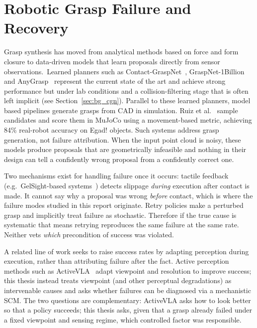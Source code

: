 \documentclass[11pt,a4paper]{report}
\begin{document}
\section{Robotic Grasp Failure and Recovery}
\label{sec:bg_grasp}

Grasp synthesis has moved from analytical methods based on force and form closure to data-driven models that learn proposals directly from sensor observations.~Learned planners such as Contact-GraspNet~\cite{sundermeyer2021contactgraspnet}, GraspNet-1Billion~\cite{fang2020graspnet} and AnyGrasp~\cite{fang2023anygrasp} represent the current state of the art and achieve strong performance but under lab conditions and a collision-filtering stage that is often left implicit (see Section~\ref{sec:bg_cgn}). Parallel to these learned planners, model based pipelines generate grasps from CAD in simulation. Ruiz et al.~\cite{ruiz2025physics} sample candidates and score them in MuJoCo using a movement-based metric, achieving 84\% real-robot accuracy on Egad! objects. Such systems address grasp generation, not failure attribution. When the input point cloud is noisy, these models produce proposals that are geometrically infeasible and nothing in their design can tell a confidently wrong proposal from a confidently correct one.

Two mechanisms exist for handling failure once it occurs: tactile feedback (e.g.\ GelSight-based systems~\cite{calandra2018more}) detects slippage \emph{during} execution after contact is made. It cannot say why a proposal was wrong \emph{before} contact, which is where the failure modes studied in this report originate. Retry policies make a perturbed grasp and implicitly treat failure as stochastic. Therefore if the true cause is systematic that means retrying reproduces the same failure at the same rate. Neither vets \emph{which} precondition of success was violated. 

A related line of work seeks to raise success rates by adapting perception during execution, rather than attributing failure after the fact. Active perception methods such as ActiveVLA~\cite{liu2026activevla} adapt viewpoint and resolution to improve success; this thesis instead treats viewpoint (and other perceptual degradations) as intervenable causes and asks whether failures can be diagnosed via a mechanistic SCM. The two questions are complementary: ActiveVLA asks how to look better so that a policy succeeds; this thesis asks, given that a grasp already failed under a fixed viewpoint and sensing regime, which controlled factor was responsible.
\end{document}
